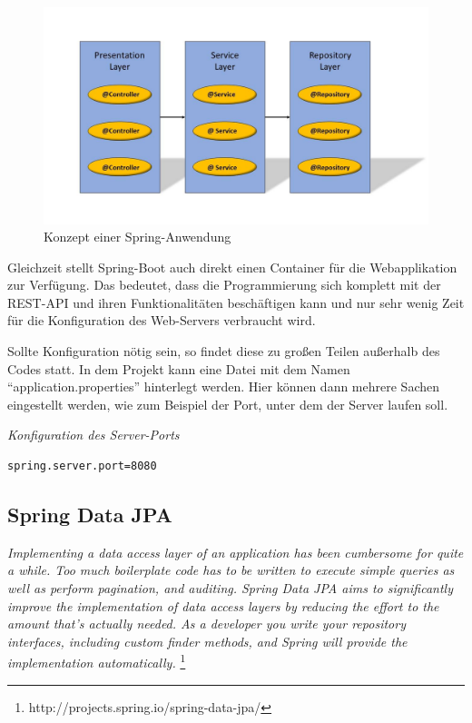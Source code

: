 \begin{figure}[htp]     %
\centering
\includegraphics[width=1\textwidth]{bilder/SpringLayers} 
\caption[Der Grafik \url{http://image.slidesharecdn.com/springsourceusi2009v3-0-090702135517-phpapp01/95/developing-modular-java-applications-13-728.jpg?cb=1246543977} nachempfunden]{Konzept einer Spring-Anwendung}
\end{figure} 

Gleichzeit stellt Spring-Boot auch direkt einen Container für die Webapplikation zur Verfügung. Das bedeutet, dass die Programmierung sich komplett mit der REST-API und ihren Funktionalitäten beschäftigen kann und nur sehr wenig Zeit für die Konfiguration des Web-Servers verbraucht wird.

Sollte Konfiguration nötig sein, so findet diese zu großen Teilen außerhalb des Codes statt. In dem Projekt kann eine Datei mit dem Namen ``application.properties'' hinterlegt werden. Hier können dann mehrere Sachen eingestellt werden, wie zum Beispiel der Port, unter dem der Server laufen soll.\\

\begin{minipage}{\textwidth}
\emph{Konfiguration des Server-Ports}
\begin{lstlisting}
spring.server.port=8080
\end{lstlisting} 
\end{minipage}

\subsection{Spring Data JPA}

\emph{\glqq   
Implementing a data access layer of an application has been cumbersome for quite a while. Too much boilerplate code has to be written to execute simple queries as well as perform pagination, and auditing. Spring Data JPA aims to significantly improve the implementation of data access layers by reducing the effort to the amount that’s actually needed. As a developer you write your repository interfaces, including custom finder methods, and Spring will provide the implementation automatically.
\grqq} \footnote{http://projects.spring.io/spring-data-jpa/} \\


